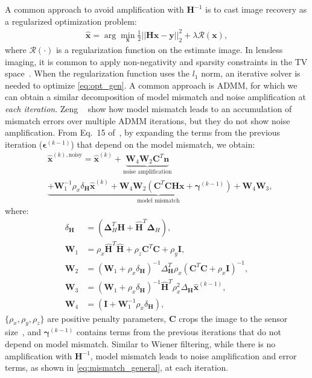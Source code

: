 A common approach to avoid amplification with $\bm{H}^{-1}$ is to cast image recovery as a regularized optimization problem:
\begin{align}
\label{eq:opt_gen}
   \bm{\hat{x}} = \arg \min_{\bm{x}} \frac{1}{2} ||\bm{H}\bm{x} - \bm{y}||_2^2 + \lambda \mathcal{R}(\bm{x}),
\end{align}
where $\mathcal{R}(\cdot)$ is a regularization function on the estimate image.
In lensless imaging, it is common to apply non-negativity and sparsity constraints in the TV space~\cite{Antipa:18,phlatcam}.
When the regularization function uses the $l_1$ norm, an iterative solver is needed to optimize \cref{eq:opt_gen}.
A common approach is ADMM, for which we can obtain a similar decomposition of model mismatch and noise amplification at \textit{each iteration}.
Zeng \etal~\cite{9546648} show how model mismatch leads to an accumulation of mismatch errors over multiple ADMM iterations, but they do not show noise amplification.
From Eq.~15 of~\cite{9546648}, by expanding the terms from the previous iteration ($\bm{\epsilon}^{(k-1)}$)  that depend on the model mismatch, we obtain:
\begin{align}
&\bm{\hat{x}}^{(k),\text{noisy}} = \bm{\hat{x}}^{(k)}  + \underbrace{\bm{W}_4 \bm{W}_2\bm{C}^T \bm{n}}_{\text{noise amplification}} \nonumber \\
\label{eq:admm_mismatch} 
&\underbrace{+ \bm{W}_1^{-1}\rho_x \delta_{\bm{H}} \bm{\hat{x}}^{(k)} + \bm{W}_4 \bm{W}_2\left(\bm{C}^T\bm{C} \bm{H}\bm{x} + \bm{\gamma}^{(k-1)} \right) + \bm{W}_4\bm{W}_3}_{\text{model mismatch}}, 
\end{align}
where:
\begin{align}
\delta_{\bm{H}} &= \left( \bm{\Delta}_H^T\bm{H} + \bm{\hat{H}}^T \bm{\Delta}_H \right),\\
\bm{W}_1 &= \rho_x \bm{\hat{H}}^T \bm{\hat{H}} + \rho_z \bm{C}^T\bm{C} + \rho_y \bm{I}, \\
\bm{W}_2 &= (\bm{W}_1 + \rho_x \delta_{\bm{H}})^{-1} \Delta_{\bm{H}}^T \rho_x (\bm{C}^T\bm{C} + \rho_x \bm{I})^{-1}, \\
\bm{W}_3 &= \left( \bm{W}_1 + \rho_x \delta_{\bm{H}} \right)^{-1} \bm{\hat{H}}^T \rho_x^2 \Delta_{\bm{H}} \bm{\hat{x}}^{(k-1)},\\
\bm{W}_4 &= (\bm{I} + \bm{W}_1^{-1} \rho_x \delta_{\bm{H}}),
\end{align}
$\{\rho_x, \rho_y, \rho_z\}$ are positive penalty parameters, $\bm{C}$ crops the image to the sensor size~\cite{Antipa:18}, and $\bm{\gamma}^{(k-1)}$ contains terms from the previous iterations that do not depend on model mismatch.
Similar to Wiener filtering, while there is no amplification with $\bm{H}^{-1}$,
model mismatch leads to noise amplification and error terms,
as shown in \cref{eq:mismatch_general},
at each iteration.

